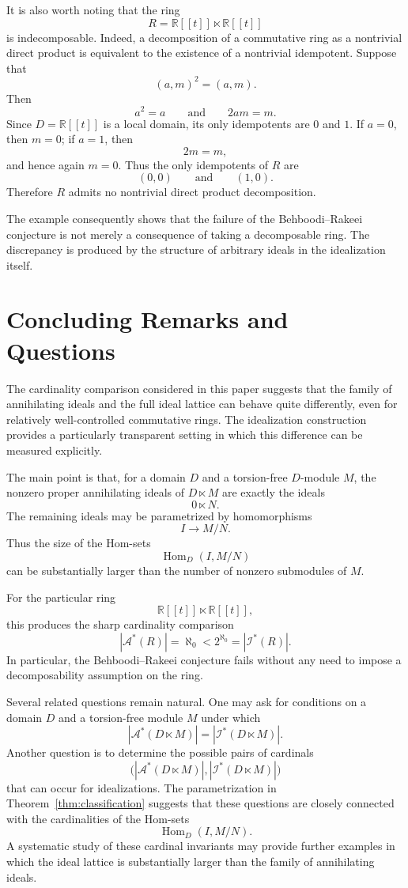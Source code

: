 \documentclass[11pt]{article}
\theoremstyle{definition}
\theoremstyle{remark}
\newcommand{\Hom}{\operatorname{Hom}}
\newcommand{\lt}{\ltimes}
\begin{document}
	It is also worth noting that the ring
	\[
	R=\mathbb R[[t]]\lt\mathbb R[[t]]
	\]
	is indecomposable. Indeed, a decomposition of a commutative ring as a
	nontrivial direct product is equivalent to the existence of a
	nontrivial idempotent. Suppose that
	\[
	(a,m)^2=(a,m).
	\]
	Then
	\[
	a^2=a
	\qquad\text{and}\qquad
	2am=m.
	\]
	Since $D=\mathbb R[[t]]$ is a local domain, its only idempotents are
	$0$ and $1$. If $a=0$, then $m=0$; if $a=1$, then
	\[
	2m=m,
	\]
	and hence again $m=0$. Thus the only idempotents of $R$ are
	\[
	(0,0)
	\qquad\text{and}\qquad
	(1,0).
	\]
	Therefore $R$ admits no nontrivial direct product decomposition.
	
	The example consequently shows that the failure of the
	Behboodi--Rakeei conjecture is not merely a consequence of taking a
	decomposable ring. The discrepancy is produced by the structure of
	arbitrary ideals in the idealization itself.
	
	
	\section{Concluding Remarks and Questions}
	
	The cardinality comparison considered in this paper suggests that
	the family of annihilating ideals and the full ideal lattice can
	behave quite differently, even for relatively well-controlled
	commutative rings. The idealization construction provides a
	particularly transparent setting in which this difference can be
	measured explicitly.
	
	The main point is that, for a domain $D$ and a torsion-free
	$D$-module $M$, the nonzero proper annihilating ideals of
	$D\ltimes M$ are exactly the ideals
	\[
	0\ltimes N.
	\]
	The remaining ideals may be parametrized by homomorphisms
	\[
	I\longrightarrow M/N.
	\]
	Thus the size of the Hom-sets
	\[
	\Hom_D(I,M/N)
	\]
	can be substantially larger than the number of nonzero submodules of
	$M$.
	
	For the particular ring
	\[
	\mathbb R[[t]]\lt\mathbb R[[t]],
	\]
	this produces the sharp cardinality comparison
	\[
	|\mathcal A^*(R)|=\aleph_0
	<
	2^{\aleph_0}
	=
	|\mathcal I^*(R)|.
	\]
	In particular, the Behboodi--Rakeei conjecture fails without any need
	to impose a decomposability assumption on the ring.
	
	Several related questions remain natural. One may ask for conditions
	on a domain $D$ and a torsion-free module $M$ under which
	\[
	|\mathcal A^*(D\lt M)|
	=
	|\mathcal I^*(D\lt M)|.
	\]
	Another question is to determine the possible pairs of cardinals
	\[
	\bigl(
	|\mathcal A^*(D\lt M)|,
	|\mathcal I^*(D\lt M)|
	\bigr)
	\]
	that can occur for idealizations. The parametrization in
	Theorem~\ref{thm:classification} suggests that these questions are
	closely connected with the cardinalities of the Hom-sets
	\[
	\Hom_D(I,M/N).
	\]
	A systematic study of these cardinal invariants may provide further
	examples in which the ideal lattice is substantially larger than the
	family of annihilating ideals.
\end{document}
